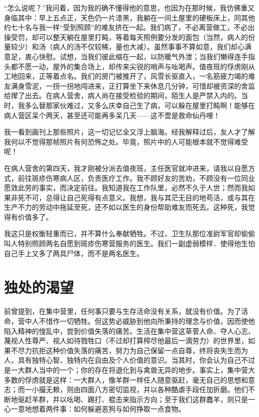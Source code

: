 \documentclass[11pt,oneside]{book}
\begin{document}
\begin{common-format}
“怎么说呢？”我问着，因为我的确不懂得他的意思，也因为在那时候，我仿佛重又身临其中：早上五点正，天色仍一片漆黑，我躺在一间土屋里的硬板床上，同其他约七十名与我一样“受到照顾”的难友挤在一起。我们病了，不必离营做工，不必出操受罚，却可以整天躺在屋里打盹，等着每天照例要分发的面包（当然，病人的份量较少）和汤（病人的汤不仅较稀，量也大减）。虽然事事不算如意，我们却心满意足，衷心快慰。试想，当我们彼此缩在一起，以防暖气外泄；当我们懒得连手指头都不愿一动，屋外的集合场上，却传来尖锐的哨声与吆喝声。值夜班的俘虏刚从工地回来，正等着点名。我们的房门被推开了，风雪长驱直入，一名筋疲力竭的难友满身雪泥，一拐一拐地闯进来，正打算坐下来休息几分钟，可惜却被资深的舍监给撵了出去。在病人营舍，病人尚在接受检验的期间，陌生人是严禁入内的。当时，我多么替那家伙难过，又多么庆幸自己生了病，可以躲在屋里打盹啊！能够在病人营区呆个两天，甚至还可能再多呆几天——这不啻是救命仙丹哩！

我一看到画刊上那些照片，这一切记忆全又浮上脑海。经我解释过后，友人才了解我何以不觉得那帧照片有何恐怖之处。毕竟，照片中的人可能根本就不觉得难受呢！

在病人营舍的第四天，我才刚被分派去值夜班，主任医官就冲进来，请我以自愿方式，前往斑疹伤寒病人区，负责医疗工作。我不顾好友的苦劝，不顾没有一位同业愿效此劳的事实，而决定前往。我知道我在工作队里，必然不久于人世；然而我如果非死不可，总得让自己死得有点意义。我想，我与其茫无目的地苟活，或与其在生产不力的劳动中拖延至死，还不如以医生的身份帮助难友而死去。这种死，我觉得有价值多了。

我这只是权衡轻重而已，并不算什么奉献牺牲。不过，卫生队那位准尉军官却偷偷叫人特别照顾两名自愿到斑疹伤寒营服务的医生。我们一副虚弱模样．使得他生怕自己手上又多了两具尸体，而不是两名医生。


\section{独处的渴望}
前曾提到，在集中营里，任何事只要与生存活命没有关系，就没有价值。为了活命，营中人不惜作一切牺牲。但这势必威胁到他向所秉持的理念与价值，因而使他陷入精神的惶乱中，尝到价值失落的痛苦。生活在集中营这草菅人命、夺人心志、蔑视人性尊严、视人如待戮牲口（不过却打算榨尽他最后一滴劳力）的世界里，如果不尽力抗拒这种价值失落的痛苦，努力为自己保留一点自尊，终将丧失生而为人，具有独特心智、独特内在自由及个人价值的意识。当其时，你会认为自己不过是一大群人当中的一个；你的存在将退化到与禽兽无异的地步。事实上，集中营大多数的俘虏就是这样：一大群人，像羊群一样任人随意驱赶，毫无自己的思想和意志；而一小撮无赖，则由四面八方密切监视，并以各种酷虐手段任加折磨。他们不断地驱赶羊群，并以吆喝、踢打、棍击来指示方向；至于我们这群蠢羊，则只是一心一意地想着两件事：如何躲避恶狗与如何挣取一点食物。


\end{common-format}
\end{document}
